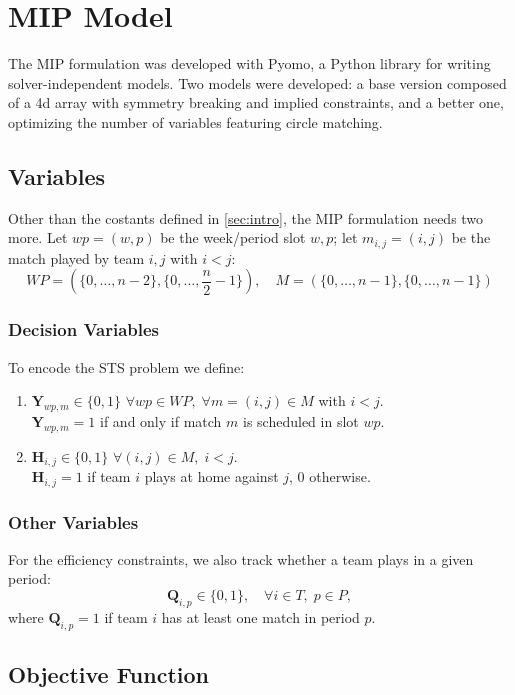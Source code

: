 

\section{MIP Model}
The MIP formulation was developed with Pyomo, a Python library for writing solver-independent models.
Two models were developed: a base version composed of a 4d array with symmetry breaking and implied constraints, and a better one, optimizing the number of variables featuring circle matching.

\subsection{Variables}
Other than the costants defined in \ref{sec:intro}, the MIP formulation needs two more.
Let $wp = (w,p)$ be the week/period slot $w,p$;
let $m_{i,j} = (i,j)$ be the match played by team $i,j$ with $i<j$:
\[
WP = (\{0, \dots, n-2\},\{0, \dots, \frac{n}{2} - 1\}), \quad M = (\{0, \dots, n-1\},\{0, \dots, n-1\})
\]

\subsubsection*{Decision Variables}
To encode the STS problem we define:
\begin{enumerate}
    \item $\mathbf{Y}_{wp,m} \in \{0,1\}$ \quad $\forall wp \in WP, \; \forall m=(i,j) \in M$ with $i<j$. \\
    $\mathbf{Y}_{wp,m} = 1$ if and only if match $m$ is scheduled in slot $wp$.
    \item $\mathbf{H}_{i,j} \in \{0,1\}$ \quad $\forall (i,j) \in M, \; i<j$. \\
    $\mathbf{H}_{i,j} = 1$ if team $i$ plays at home against $j$, $0$ otherwise.
\end{enumerate}

\subsubsection*{Other Variables}
For the efficiency constraints, we also track whether a team plays in a given period:
\[
\mathbf{Q}_{i,p} \in \{0,1\}, \quad \forall i \in T, \; p \in P,
\]
where $\mathbf{Q}_{i,p} = 1$ if team $i$ has at least one match in period $p$.

\subsection{Objective Function}
